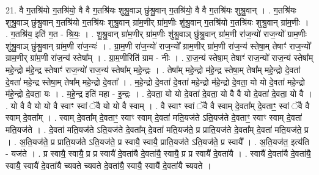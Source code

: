 \documentclass[17pt]{extarticle}
\begin{document}
21. वै ग॒तश्रि॑यो ग॒तश्रि॑यो॒ वै वै ग॒तश्रि॑यः शुश्रु॒वाञ् छु॑श्रु॒वान् ग॒तश्रि॑यो॒ वै वै ग॒तश्रि॑यः शुश्रु॒वान् । . ग॒तश्रि॑यः शुश्रु॒वाञ् छु॑श्रु॒वान् ग॒तश्रि॑यो ग॒तश्रि॑यः शुश्रु॒वान् ग्रा॑म॒णीर् ग्रा॑म॒णीः शु॑श्रु॒वान् ग॒तश्रि॑यो ग॒तश्रि॑यः शुश्रु॒वान् ग्रा॑म॒णीः । . ग॒तश्रि॑य॒ इति॑ ग॒त - श्रि॒यः॒ । . शु॒श्रु॒वान् ग्रा॑म॒णीर् ग्रा॑म॒णीः शु॑श्रु॒वाञ् छु॑श्रु॒वान् ग्रा॑म॒णी रा॑ज॒न्यो॑ राज॒न्यो᳚ ग्राम॒णीः शु॑श्रु॒वाञ् छु॑श्रु॒वान् ग्रा॑म॒णी रा॑ज॒न्यः॑ । . ग्रा॒म॒णी रा॑ज॒न्यो॑ राज॒न्यो᳚ ग्राम॒णीर् ग्रा॑म॒णी रा॑ज॒न्य॑ स्तेषा॒म् तेषाꣳ॑ राज॒न्यो᳚ ग्राम॒णीर् ग्रा॑म॒णी रा॑ज॒न्य॑ स्तेषा᳚म् । . ग्रा॒म॒णीरिति॑ ग्राम - नीः । . रा॒ज॒न्य॑ स्तेषा॒म् तेषाꣳ॑ राज॒न्यो॑ राज॒न्य॑ स्तेषा᳚म् महे॒न्द्रो म॑हे॒न्द्र स्तेषाꣳ॑ राज॒न्यो॑ राज॒न्य॑ स्तेषा᳚म् महे॒न्द्रः । . तेषा᳚म् महे॒न्द्रो म॑हे॒न्द्र स्तेषा॒म् तेषा᳚म् महे॒न्द्रो दे॒वता॑ दे॒वता॑ महे॒न्द्र स्तेषा॒म् तेषा᳚म् महे॒न्द्रो दे॒वता᳚ । . म॒हे॒न्द्रो दे॒वता॑ दे॒वता॑ महे॒न्द्रो म॑हे॒न्द्रो दे॒वता॒ यो यो दे॒वता॑ महे॒न्द्रो म॑हे॒न्द्रो दे॒वता॒ यः । . म॒हे॒न्द्र इति॑ महा - इ॒न्द्रः । . दे॒वता॒ यो यो दे॒वता॑ दे॒वता॒ यो वै वै यो दे॒वता॑ दे॒वता॒ यो वै । . यो वै वै यो यो वै स्वाꣳ स्वां ॅवै यो यो वै स्वाम् । . वै स्वाꣳ स्वां ॅवै वै स्वाम् दे॒वता᳚म् दे॒वताꣳ॒॒ स्वां ॅवै वै स्वाम् दे॒वता᳚म् । . स्वाम् दे॒वता᳚म् दे॒वताꣳ॒॒ स्वाꣳ स्वाम् दे॒वता॑ मति॒यज॑ते ऽति॒यज॑ते दे॒वताꣳ॒॒ स्वाꣳ स्वाम् दे॒वता॑ मति॒यज॑ते । . दे॒वता॑ मति॒यज॑ते ऽति॒यज॑ते दे॒वता᳚म् दे॒वता॑ मति॒यज॑ते॒ प्र प्राति॒यज॑ते दे॒वता᳚म् दे॒वता॑ मति॒यज॑ते॒ प्र । . अ॒ति॒यज॑ते॒ प्र प्राति॒यज॑ते ऽति॒यज॑ते॒ प्र स्वायै॒ स्वायै॒ प्राति॒यज॑ते ऽति॒यज॑ते॒ प्र स्वायै᳚ । . अ॒ति॒यज॑त॒ इत्य॑ति - यज॑ते । . प्र स्वायै॒ स्वायै॒ प्र प्र स्वायै॑ दे॒वता॑यै दे॒वता॑यै॒ स्वायै॒ प्र प्र स्वायै॑ दे॒वता॑यै । . स्वायै॑ दे॒वता॑यै दे॒वता॑यै॒ स्वायै॒ स्वायै॑ दे॒वता॑यै च्यवते च्यवते दे॒वता॑यै॒ स्वायै॒ स्वायै॑ दे॒वता॑यै च्यवते । \newline
\end{document}

